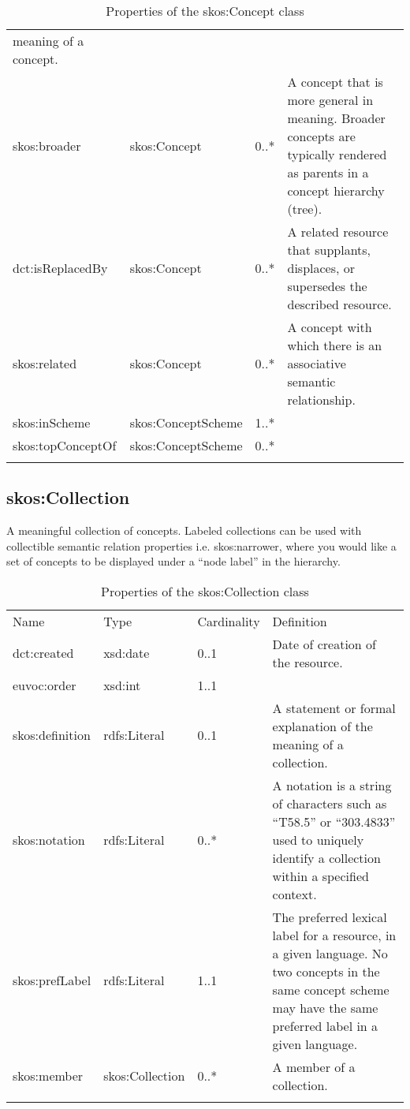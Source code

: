 {\begin{longtable}[c]{@{}p{3cm}p{3cm}p{1.5cm}p{7cm}@{}}
		meaning of a concept.
		\\\addlinespace
		skos:broader & skos:Concept & 0..* & A concept that is more general in
		meaning. Broader concepts are typically rendered as parents in a concept
		hierarchy (tree).
		\\\addlinespace
		dct:isReplacedBy & skos:Concept & 0..* & A related resource that
		supplants, displaces, or supersedes the described resource.
		\\\addlinespace
		skos:related & skos:Concept & 0..* & A concept with which there is an
		associative semantic relationship.
		\\\addlinespace
		skos:inScheme & skos:ConceptScheme & 1..* &
		\\\addlinespace
		skos:topConceptOf & skos:ConceptScheme & 0..*
		\\\addlinespace
		\bottomrule
		\addlinespace
		\caption{Properties of the skos:Concept class}
	\end{longtable}
}

\subsection{skos:Collection}

A meaningful collection of concepts. Labeled collections can be used
with collectible semantic relation properties i.e. skos:narrower, where
you would like a set of concepts to be displayed under a ``node label'' in
the hierarchy.

{
	\footnotesize
	\selectfont%
	\begin{longtable}[c]{@{}p{3cm}p{2cm}p{2cm}p{7.8cm}@{}}
		\toprule\addlinespace
		Name & Type & Cardinality & Definition
		\\\addlinespace
		\midrule\endhead
		dct:created & xsd:date & 0..1 & Date of creation of the resource.
		\\\addlinespace
		euvoc:order & xsd:int & 1..1 &
		\\\addlinespace
		skos:definition & rdfs:Literal & 0..1 & A statement or formal
		explanation of the meaning of a collection.
		\\\addlinespace
		skos:notation & rdfs:Literal & 0..* & A notation is a string of
		characters such as ``T58.5'' or ``303.4833'' used to uniquely identify a
		collection within a specified
		context.
		\\\addlinespace
		skos:prefLabel & rdfs:Literal & 1..1 & The preferred lexical label for a
		resource, in a given language. No two concepts in the same concept
		scheme may have the same preferred label in a given language.
		\\\addlinespace
		skos:member & skos:Collection & 0..* & A member of a collection.
		\\\addlinespace
		\bottomrule
		\addlinespace
		\caption{Properties of the skos:Collection class}
	\end{longtable}
}

